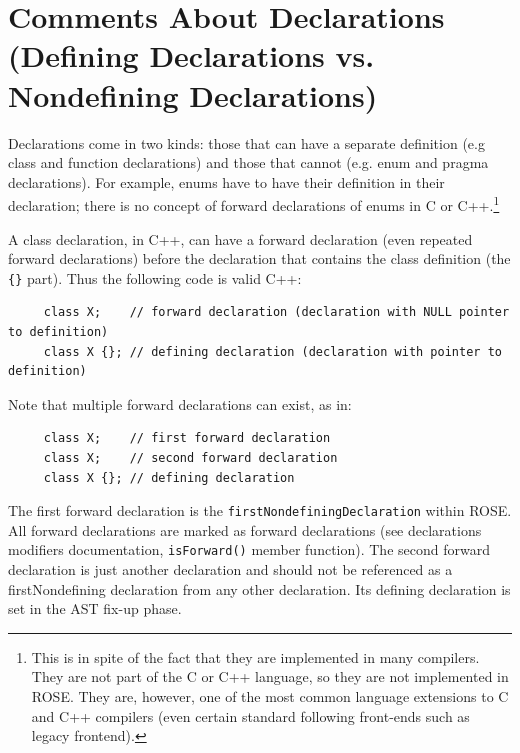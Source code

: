 \section{Comments About Declarations (Defining Declarations vs. Nondefining
    Declarations) }

    Declarations come in two kinds: those that can have a separate definition (e.g class
and function declarations) and those that cannot (e.g. enum and pragma declarations).
For example, enums have to have their definition in their declaration; there is no concept of
forward declarations of enums in C or C++.\footnote{This is in spite of the fact that they
    are implemented in many compilers. They are not part of the C or C++ language, so 
they are not implemented in ROSE.  They are, however, one of the most common language
extensions to C and C++ compilers (even certain standard following front-ends such as legacy frontend).}

A class declaration, in C++, can have a forward declaration (even repeated forward declarations)
before the declaration that contains the class definition (the {\tt \{\}} part).  Thus 
the following code is valid C++:
{\indent
{\mySmallFontSize
\begin{verbatim}
     class X;    // forward declaration (declaration with NULL pointer to definition)
     class X {}; // defining declaration (declaration with pointer to definition)
\end{verbatim}
}}
Note that multiple forward declarations can exist, as in:
{\indent
{\mySmallFontSize
\begin{verbatim}
     class X;    // first forward declaration
     class X;    // second forward declaration
     class X {}; // defining declaration
\end{verbatim}
}}
   The first forward declaration is the {\tt firstNondefiningDeclaration} within ROSE.
All forward declarations are marked as forward declarations (see declarations modifiers
documentation, {\tt isForward()} member function). The second forward declaration is just 
another declaration and should not be referenced as a firstNondefining declaration from
any other declaration. Its defining declaration is set in the AST fix-up phase.

